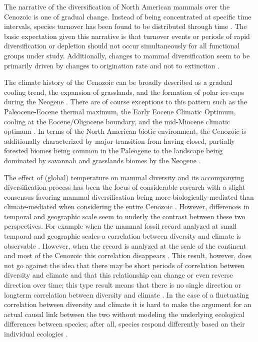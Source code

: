 \documentclass[12pt,letterpaper]{article}
\begin{document}
The narrative of the diversification of North American mammals over the Cenozoic is one of gradual change. Instead of being concentrated at specific time intervals, species turnover has been found to be distributed through time \citep{Alroy2009,Alroy1996a,Eronen2015,Janis1993b,Alroy2000g}. The basic expectation given this narrative is that turnover events or periods of rapid diversification or depletion should not occur simultaneously for all functional groups under study. Additionally, changes to mammal diversification seem to be primarily driven by changes to origination rate and not to extinction \citep{Alroy1996a,Alroy2000g,Alroy2009}. %

The climate history of the Cenozoic can be broadly described as a gradual cooling trend, the expansion of grasslands, and the formation of polar ice-caps during the Neogene \citep{Zachos2001,Zachos2008,Cramer2011}. There are of course exceptions to this pattern such as the Paleocene-Eocene thermal maximum, the Early Eocene Climatic Optimum, cooling at the Eocene/Oligocene boundary, and the mid-Miocene climatic optimum \citep{Zachos2001,Zachos2008}. In terms of the North American biotic environment, the Cenozoic is additionally characterized by major transition from having closed, partially forested biomes being common in the Paleogene to the landscape being dominated by savannah and grasslands biomes by the Neogene \citep{Blois2009,Janis1993b,Janis2000,Stromberg2005}. 

The effect of (global) temperature on mammal diversity and its accompanying diversification process has been the focus of considerable research with a slight consensus favoring mammal diversification being more biologically-mediated than climate-mediated when considering the entire Cenozoic \citep{Alroy2000g,Figueirido2012,Clyde1998a}. However, differences in temporal and geographic scale seem to underly the contrast between these two perspectives. For example when the mammal fossil record analyzed at small temporal and geographic scales a correlation between diversity and climate is observable \citep{Clyde1998a,Woodburne2009}. However, when the record is analyzed at the scale of the continent and most of the Cenozoic this correlation disappears \citep{Alroy2000g}. This result, however, does not go against the idea that there may be short periods of correlation between diversity and climate and that this relationship can change or even reverse direction over time; this type result means that there is no single direction or longterm correlation between diversity and climate \citep{Figueirido2012}. In the case of a fluctuating correlation between diversity and climate it is hard to make the argument for an actual causal link between the two without modeling the underlying ecological differences between species; after all, species respond differently based on their individual ecologies \citep{Blois2009}. 
\end{document}
